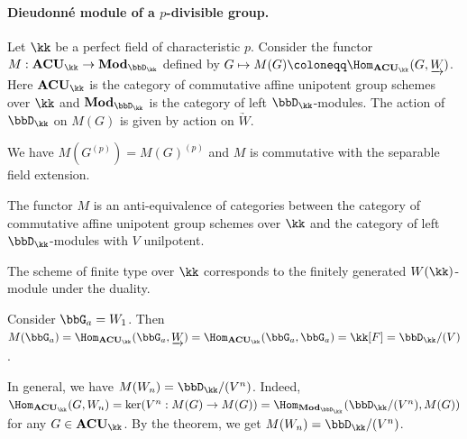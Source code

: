 \paragraph{Dieudonné module of a $p$-divisible group.}
Let $\kk$ be a perfect field of characteristic $p$.
Consider the functor $M: \mathbf{ACU}_\kk \to \mathbf{Mod}_{\bbD_\kk}$ defined by $G \mapsto M(G) \coloneqq \Hom_{\mathbf{ACU}_\kk}(G, \underrightarrow{W})$.
Here $\mathbf{ACU}_\kk$ is the category of commutative affine unipotent group schemes over $\kk$ and $\mathbf{Mod}_{\bbD_\kk}$ is the category of left $\bbD_\kk$-modules.
The action of $\bbD_\kk$ on $M(G)$ is given by action on $\underrightarrow{W}$.

\begin{remark}
	We have $M(G^{(p)}) = M(G)^{(p)}$ and $M$ is commutative with the separable field extension.
\end{remark}

\begin{theorem}[Dieudonné]
	The functor $M$ is an anti-equivalence of categories between the category of commutative affine unipotent group schemes over $\kk$ and the category of left $\bbD_\kk$-modules with $V$ unilpotent.
\end{theorem}

The scheme of finite type over $\kk$ corresponds to the finitely generated $W(\kk)$-module under the duality.

\begin{example}
	Consider $\bbG_a = W_1$.
	Then $M(\bbG_a) = \Hom_{\mathbf{ACU}_\kk}(\bbG_a, \underrightarrow{W}) = \Hom_{\mathbf{ACU}_\kk}(\bbG_a, \bbG_a) = \kk[F] = \bbD_\kk / (V)$.

	In general, we have $M(W_n) = \bbD_\kk / (V^n)$.
	Indeed, $\Hom_{\mathbf{ACU}_\kk}(G, W_n) = \ker (V^n: M(G) \to M(G)) = \Hom_{\mathbf{Mod}_{\bbD_\kk}}(\bbD_\kk / (V^n), M(G))$ for any $G \in \mathbf{ACU}_\kk$.
	By the theorem, we get $M(W_n) = \bbD_\kk / (V^n)$.
\end{example}

